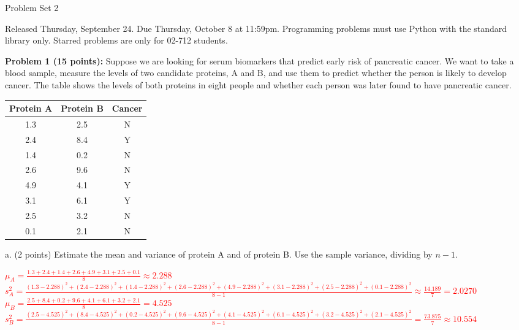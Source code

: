 \documentclass[11pt]{article}
\begin{document}

\begin{center}
{\huge Problem Set 2 }\\
\end{center}

Released Thursday, September 24. Due Thursday, October 8 at 11:59pm.
Programming problems must use Python with the standard library only.
Starred problems are only for 02-712 students.

{\bf Problem 1 (15 points):} Suppose we are looking for serum biomarkers
that predict early risk of pancreatic cancer.  We want to take a blood
sample, measure the levels of two candidate proteins, A and B, and use them
to predict whether the person is likely to develop cancer.  The table shows
the levels of both proteins in eight people and whether each person was
later found to have pancreatic cancer.

\begin{center}
\begin{tabular}{|c|c|c|}
\hline
Protein A & Protein B & Cancer\\
\hline
1.3 & 2.5 & N\\
2.4 & 8.4 & Y\\
1.4 & 0.2 & N\\
2.6 & 9.6 & N\\
4.9 & 4.1 & Y\\
3.1 & 6.1 & Y\\
2.5 & 3.2 & N\\
0.1 & 2.1 & N\\
\hline
\end{tabular}
\end{center}

a. (2 points) Estimate the mean and variance of protein A and of protein B. Use the sample variance, dividing by $n-1$.

\textcolor{red}{%
$\mu_A = \frac{1.3 + 2.4 + 1.4 + 2.6 + 4.9 + 3.1 + 2.5 + 0.1}{8} \approx 2.288$\\
$s^2_A = \frac{(1.3 - 2.288)^2 + (2.4 - 2.288)^2 + (1.4 - 2.288)^2 + (2.6 - 2.288)^2 + (4.9 - 2.288)^2 + (3.1 - 2.288)^2 + (2.5 - 2.288)^2 + (0.1 - 2.288)^2}{8-1} \approx \frac{14.189}{7} = 2.0270$\\
$\mu_B = \frac{2.5 + 8.4 + 0.2 + 9.6 + 4.1 + 6.1 + 3.2 + 2.1}{8} = 4.525$\\
$s^2_B = \frac{(2.5 - 4.525)^2 + (8.4 - 4.525)^2 + (0.2 - 4.525)^2 + (9.6 - 4.525)^2 + (4.1 - 4.525)^2 + (6.1 - 4.525)^2 + (3.2 - 4.525)^2 + (2.1 - 4.525)^2}{8-1} = \frac{73.875}{7} \approx 10.554$\\
}
\end{document}
